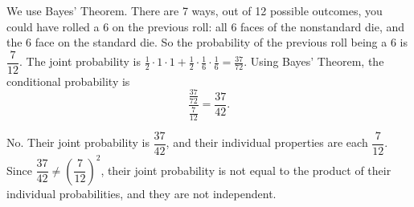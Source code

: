 \documentclass[12pt]{exam}
\begin{document}
\begin{solution}
    \begin{qparts}
        \item We use Bayes' Theorem. There are 7 ways, out of 12 possible outcomes, you could have rolled a 6 on the previous roll: all 6 faces of the nonstandard die, and the 6 face on the standard die. So the probability of the previous roll being a 6 is $\dfrac{7}{12}$. The joint probability is $ \frac{1}{2} \cdot 1 \cdot 1 + \frac{1}{2} \cdot \frac{1}{6} \cdot \frac{1}{6} = \frac{37}{72} $. Using Bayes' Theorem, the conditional probability is 
        \[ \frac{\frac{37}{72}}{\frac{7}{12}} = \boxed{\frac{37}{42}}. \]
        \item No. Their joint probability is $\dfrac{37}{42}$, and their individual properties are each $\dfrac{7}{12}$. Since $\dfrac{37}{42} \neq \left(\dfrac{7}{12}\right)^2$, their joint probability is not equal to the product of their individual probabilities, and they are not independent.
    \end{qparts}
\end{solution}
\end{document}
